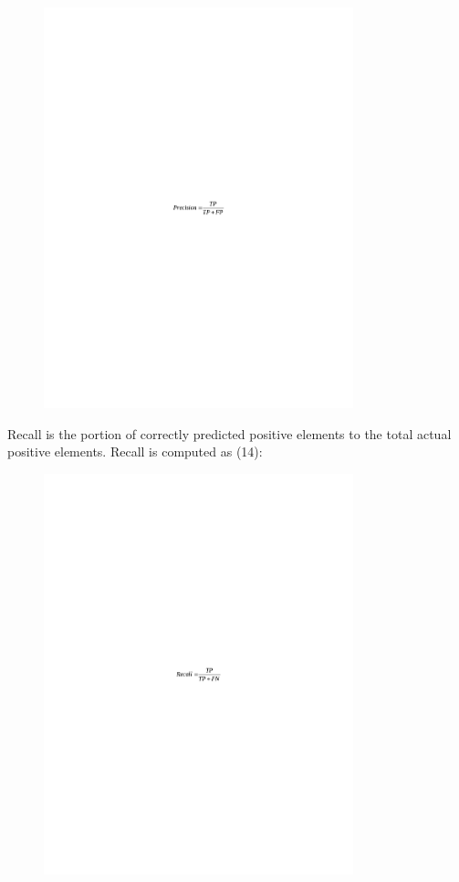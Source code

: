 \begin{figure}[H]
	\centering
	\includegraphics[width=0.8\textwidth]{media/ict/image82}
	\caption*{}
\end{figure}


Recall is the portion of correctly predicted positive elements to the
total actual positive elements. Recall is computed as (14):

\begin{figure}[H]
	\centering
	\includegraphics[width=0.8\textwidth]{media/ict/image83}
	\caption*{}
\end{figure}


